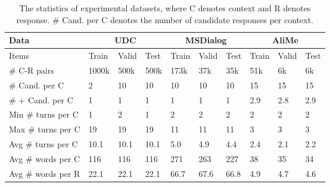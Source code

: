  \begin{table}[]
	\footnotesize
	\centering
	\caption{The statistics of experimental datasets, where C denotes context and R denotes response. \# Cand. per C denotes the number of candidate responses per context.}
	\vspace{-0.1in}
	\label{tab:exp_data_stat_train_valid_test}
	\begin{tabular}{l | p{0.35cm} p{0.35cm} p{0.35cm} | p{0.35cm} p{0.35cm} p{0.35cm} | p{0.3cm} p{0.3cm} p{0.3cm}}
		\hline \hline
		Data                               & \multicolumn{3}{c|}{UDC}      & \multicolumn{3}{c|}{MSDialog} & \multicolumn{3}{c}{AliMe} \\ \hline
		Items                              & Train     & Valid   & Test    & Train     & Valid   & Test    & Train    & Valid  & Test   \\ \hline
		\# C-R pairs          & 1000k & 500k & 500k & 173k   & 37k  & 35k  & 51k   & 6k  & 6k  \\ \hline
		\# Cand. per C          & 2         & 10      & 10      & 10        & 10      & 10      & 15       & 15     & 15     \\ \hline
		\# + Cand. per C & 1         & 1       & 1       & 1         & 1       & 1       & 2.9      & 2.8    & 2.9    \\ \hline
		Min \# turns per C           & 1         & 2       & 1       & 2         & 2       & 2       & 2        & 2      & 2      \\ \hline
		Max \# turns per C           & 19        & 19      & 19      & 11        & 11      & 11      & 3        & 3      & 3      \\ \hline
		Avg \# turns per C           & 10.1      & 10.1    & 10.1    & 5.0       & 4.9     & 4.4     & 2.4      & 2.1    & 2.2    \\ \hline
		Avg \# words per C           & 116     & 116   & 116   & 271     & 263   & 227   & 38     & 35   & 34   \\ \hline
		Avg \# words per R          & 22.1      & 22.1    & 22.1    & 66.7      & 67.6    & 66.8    & 4.9      & 4.7    & 4.6    \\ \hline \hline
	\end{tabular}
\end{table}

